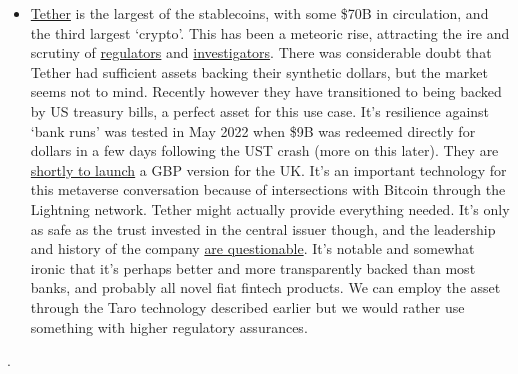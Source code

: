\begin{itemize}
\item \href{https://tether.to/en/whitepaper/}{Tether} is the largest of the stablecoins, with some \$70B in circulation, and the third largest `crypto'. This has been a meteoric rise, attracting the ire and scrutiny of \href{https://www.cftc.gov/PressRoom/PressReleases/8450-21}{regulators} and \href{https://www.bloomberg.com/news/features/2021-10-07/crypto-mystery-where-s-the-69-billion-backing-the-stablecoin-tether}{investigators}. There was considerable doubt that Tether had sufficient assets backing their synthetic dollars, but the market seems not to mind. Recently however they have transitioned to being backed by US treasury bills, a perfect asset for this use case. It's resilience against `bank runs' was tested in May 2022 when \$9B was redeemed directly for dollars in a few days following the UST crash (more on this later). They are \href{https://tether.to/en/tether-to-launch-gbpt-tether-tokens-pegged-to-the-british-pound-sterling/}{shortly to launch} a GBP version for the UK. It's an important technology for this metaverse conversation because of intersections with Bitcoin through the Lightning network. Tether might actually provide everything needed. It's only as safe as the trust invested in the central issuer though, and the leadership and history of the company \href{https://www.wsj.com/articles/tether-ownership-and-company-weaknesses-revealed-in-documents-11675363340}{are questionable}. It's notable and somewhat ironic that it's perhaps  better and more transparently backed than most banks, and probably all novel fiat fintech products. We can employ the asset through the Taro technology described earlier but we would rather use something with higher regulatory assurances.
\end{itemize}  .
